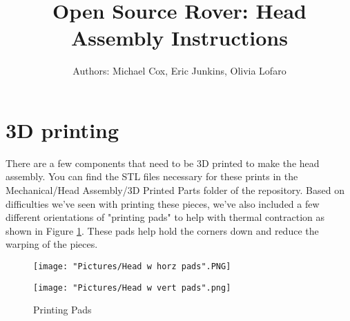 \documentclass[12pt]{article}
\begin{document}
\title{Open Source Rover: Head Assembly Instructions}
\author{Authors: Michael Cox, Eric Junkins, Olivia Lofaro}

\makeatletter         
\def\@maketitle{
\begin{center}	
	\makebox[\textwidth][c]{ \texttt{[image: "Pictures/Head final".png]}}
	{\Huge \bfseries \sffamily \@title }\\[3ex] 
	{\Large \sffamily \@author}\\[3ex] 
	\texttt{[image: "Pictures/JPL logo".png]}
\end{center}}
\makeatother

\maketitle



\newpage


\tableofcontents

\newpage

\section{3D printing}
There are a few components that need to be 3D printed to make the head assembly. You can find the STL files necessary for these prints in the Mechanical/Head Assembly/3D Printed Parts folder of the repository.  Based on difficulties we've seen with printing these pieces, we've also included a few different orientations of "printing pads" to help with thermal contraction as shown in Figure \ref{pads}. These pads help hold the corners down and reduce the warping of the pieces.

\begin{figure}[H]
  \centering
  \begin{minipage}[b]{0.45\textwidth}
    \texttt{[image: "Pictures/Head w horz pads".PNG]}
  \end{minipage}
  \hfill
  \begin{minipage}[b]{0.45\textwidth}
    \texttt{[image: "Pictures/Head w vert pads".png]}
  \end{minipage}
  \caption{Printing Pads}
  \label{pads}
\end{figure}
\end{document}
